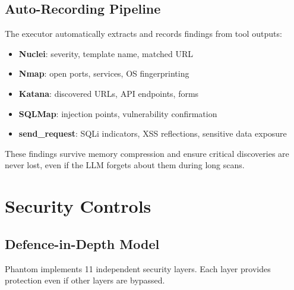 \documentclass[11pt,a4paper]{article}
\begin{document}
\subsection{Auto-Recording Pipeline}
The executor automatically extracts and records findings from tool outputs:
\begin{itemize}[noitemsep]
  \item \textbf{Nuclei}: severity, template name, matched URL
  \item \textbf{Nmap}: open ports, services, OS fingerprinting
  \item \textbf{Katana}: discovered URLs, API endpoints, forms
  \item \textbf{SQLMap}: injection points, vulnerability confirmation
  \item \textbf{send\_request}: SQLi indicators, XSS reflections, sensitive data exposure
\end{itemize}

These findings survive memory compression and ensure critical discoveries are
never lost, even if the LLM forgets about them during long scans.


\section{Security Controls}
\label{sec:security}

\subsection{Defence-in-Depth Model}
Phantom implements 11 independent security layers. Each layer provides protection
even if other layers are bypassed.
\end{document}
